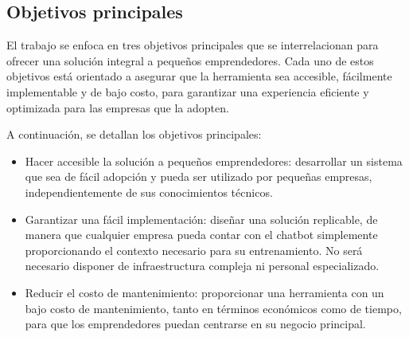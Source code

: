 

\subsection{Objetivos principales}

El trabajo se enfoca en tres objetivos principales que se interrelacionan para ofrecer una solución integral a pequeños emprendedores. Cada uno de estos objetivos está orientado a asegurar que la herramienta sea accesible, fácilmente implementable y de bajo costo, para garantizar una experiencia eficiente y optimizada para las empresas que la adopten. 
 
A continuación, se detallan los objetivos principales:


\begin{itemize}
    \item Hacer accesible la solución a pequeños emprendedores: desarrollar un sistema que sea de fácil adopción y pueda ser utilizado por pequeñas empresas, independientemente de sus conocimientos técnicos.
    
    \item Garantizar una fácil implementación: diseñar una solución replicable, de manera que cualquier empresa pueda contar con el chatbot simplemente proporcionando el contexto necesario para su entrenamiento. No será necesario disponer de infraestructura compleja ni personal especializado.
    
    \item Reducir el costo de mantenimiento: proporcionar una herramienta con un bajo costo de mantenimiento, tanto en términos económicos como de tiempo, para que los emprendedores puedan centrarse en su negocio principal.
    
\end{itemize}



